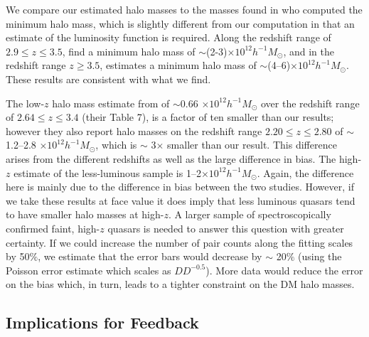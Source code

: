 \documentclass[apj, numberedappendix]{emulateapj}
\begin{document}
We compare our estimated halo masses to the masses found in \citet{Shen2007} who computed the minimum halo mass, which is slightly different from our computation in that an estimate of the luminosity function is required. Along the redshift range of $2.9 \leq z \leq 3.5$, \citet{Shen2007} find a minimum halo mass of $\sim$(2-3)$\times 10^{12} h^{-1}M_{\odot}$, and in the redshift range $z \geq 3.5$, \citet{Shen2007} estimates a minimum halo mass of $\sim$(4--6)$\times 10^{12} h^{-1}M_{\odot}$. These results are consistent with what we find.

The low-$z$ halo mass estimate from \citet{Eft2015} of $\sim$0.66 $\times 10^{12} h^{-1}M_{\odot}$ over the redshift range of $2.64 \leq z \leq 3.4$ (their Table 7), is a factor of ten smaller than our results; however they also report halo masses on the redshift range $2.20 \leq z \leq 2.80$ of $\sim$ 1.2--2.8 $\times 10^{12} h^{-1}M_{\odot}$, which is $\sim$ 3$\times$ smaller than our result. This difference arises from the different redshifts as well as the large difference in bias. The high-$z$ estimate of the \citet{He2017} less-luminous sample is 1--2$\times 10^{12} h^{-1}M_{\odot}$. Again, the difference here is mainly due to the difference in bias between the two studies. However, if we take these results at face value it does imply that less luminous quasars tend to have smaller halo masses at high-$z$. A larger sample of spectroscopically confirmed faint, high-$z$ quasars is needed to answer this question with greater certainty. If we could increase the number of pair counts along the fitting scales by 50$\%$, we estimate that the error bars would decrease by $\sim$ 20$\%$ (using the Poisson error estimate which scales as $DD^{-0.5}$). More data would reduce the error on the bias which, in turn, leads to a tighter constraint on the DM halo masses.

\subsection{Implications for Feedback}\label{sec:feedbackmod}
\end{document}
